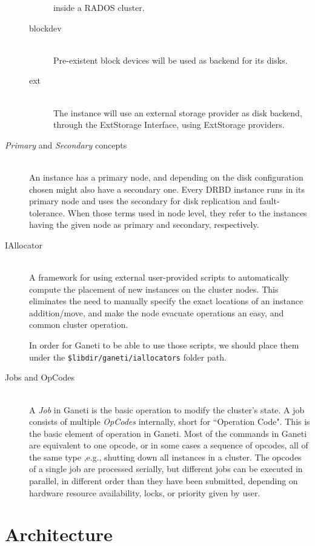 \begin{description}
\begin{description}
        inside a RADOS cluster.
      \item[blockdev] \hfill \\
        Pre-existent block devices will be used as backend for its disks.
      \item[ext] \hfill \\
        The instance will use an external storage provider as disk backend,
        through the ExtStorage Interface, using ExtStorage providers.
    \end{description}
  \item[\emph{Primary} and \emph{Secondary} concepts] \hfill \\
    An instance has a primary node, and depending on the disk configuration
    chosen might also have a secondary one. Every DRBD instance runs in its
    primary node and uses the secondary for disk replication and
    fault-tolerance. When those terms used in node level, they refer to the
    instances having the given node as primary and secondary, respectively.
  \item[IAllocator] \hfill \\
    A framework for using external user-provided scripts to automatically
    compute the placement of new instances on the cluster nodes. This
    eliminates the need to manually specify the exact locations of an instance
    addition/move, and make the node evacuate operations an easy, and common
    cluster operation.

    In order for Ganeti to be able to use those scripts, we should place them
    under the \texttt{\$libdir/ganeti/iallocators} folder path.
  \item[Jobs and OpCodes] \hfill \\
    A \emph{Job} in Ganeti is the basic operation to modify the cluster's state.
    A job consists of multiple \emph{OpCodes} internally, short for ``Operation
    Code". This is the basic element of operation in Ganeti. Most of the
    commands in Ganeti are equivalent to one opcode, or in some cases a sequence
    of opcodes, all of the same type ,e.g., shutting down all instances in a
    cluster. The opcodes of a single job are processed serially, but different
    jobs can be executed in parallel, in different order than they have been
    submitted, depending on hardware resource availability, locks, or priority
    given by user.
\end{description}

\section{Architecture}\label{sec:architecture}

